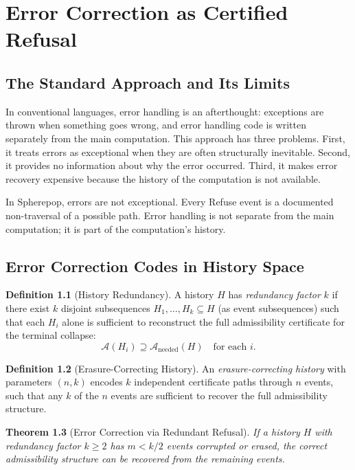 \documentclass[12pt, a4paper, openany]{book}
\theoremstyle{plain}
\newtheorem{theorem}{Theorem}[chapter]
\theoremstyle{definition}
\newtheorem{definition}[theorem]{Definition}
\theoremstyle{remark}
\newcommand{\calA}{\mathcal{A}}
\begin{document}
\chapter{Error Correction as Certified Refusal}

\section{The Standard Approach and Its Limits}

In conventional languages, error handling is an afterthought: exceptions are
thrown when something goes wrong, and error handling code is written separately
from the main computation. This approach has three problems. First, it treats
errors as exceptional when they are often structurally inevitable. Second, it
provides no information about why the error occurred. Third, it makes error
recovery expensive because the history of the computation is not available.

In Spherepop, errors are not exceptional. Every Refuse event is a documented
non-traversal of a possible path. Error handling is not separate from the main
computation; it is part of the computation's history.

\section{Error Correction Codes in History Space}

\begin{definition}[History Redundancy]
A history $H$ has \emph{redundancy factor} $k$ if there exist $k$ disjoint
subsequences $H_1, \ldots, H_k \subseteq H$ (as event subsequences) such that
each $H_i$ alone is sufficient to reconstruct the full admissibility certificate
for the terminal collapse:
\[
\calA(H_i) \supseteq \calA_{\mathrm{needed}}(H) \quad \text{for each } i.
\]
\end{definition}

\begin{definition}[Erasure-Correcting History]
An \emph{erasure-correcting history} with parameters $(n, k)$ encodes $k$
independent certificate paths through $n$ events, such that any $k$ of the $n$
events are sufficient to recover the full admissibility structure.
\end{definition}

\begin{theorem}[Error Correction via Redundant Refusal]
If a history $H$ with redundancy factor $k \geq 2$ has $m < k/2$ events
corrupted or erased, the correct admissibility structure can be recovered from
the remaining events.
\end{theorem}
\end{document}
